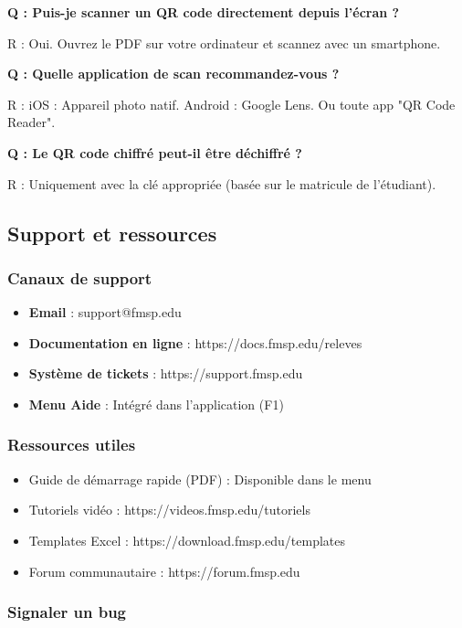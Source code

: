 \textbf{Q : Puis-je scanner un QR code directement depuis l'écran ?}

R : Oui. Ouvrez le PDF sur votre ordinateur et scannez avec un smartphone.

\textbf{Q : Quelle application de scan recommandez-vous ?}

R : iOS : Appareil photo natif. Android : Google Lens. Ou toute app "QR Code Reader".

\textbf{Q : Le QR code chiffré peut-il être déchiffré ?}

R : Uniquement avec la clé appropriée (basée sur le matricule de l'étudiant).

\subsection{Support et ressources}

\subsubsection{Canaux de support}

\begin{itemize}[leftmargin=*]
    \item \textbf{Email} : support@fmsp.edu
    \item \textbf{Documentation en ligne} : https://docs.fmsp.edu/releves
    \item \textbf{Système de tickets} : https://support.fmsp.edu
    \item \textbf{Menu Aide} : Intégré dans l'application (F1)
\end{itemize}

\subsubsection{Ressources utiles}

\begin{itemize}[leftmargin=*]
    \item Guide de démarrage rapide (PDF) : Disponible dans le menu 
    \item Tutoriels vidéo : https://videos.fmsp.edu/tutoriels
    \item Templates Excel : https://download.fmsp.edu/templates
    \item Forum communautaire : https://forum.fmsp.edu
\end{itemize}

\subsubsection{Signaler un bug}

